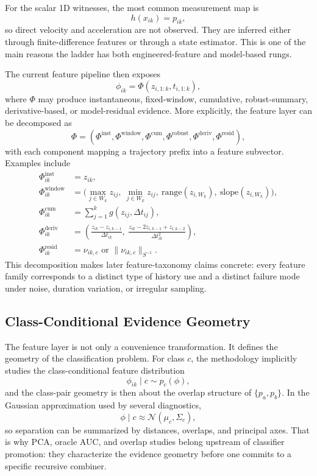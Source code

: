 \documentclass[11pt]{article}
\begin{document}
For the scalar 1D witnesses, the most common measurement map is
\begin{equation}
h(x_{ik}) = p_{ik},
\end{equation}
so direct velocity and acceleration are not observed. They are inferred either
through finite-difference features or through a state estimator. This is one of
the main reasons the ladder has both engineered-feature and model-based rungs.

The current feature pipeline then exposes
\begin{equation}
\phi_{ik} = \Phi(z_{i,1:k}, t_{i,1:k}),
\end{equation}
where \(\Phi\) may produce instantaneous, fixed-window, cumulative, robust-summary, derivative-based, or model-residual evidence.
More explicitly, the feature layer can be decomposed as
\begin{equation}
\Phi
=
(\Phi^{\mathrm{inst}},
\Phi^{\mathrm{window}},
\Phi^{\mathrm{cum}},
\Phi^{\mathrm{robust}},
\Phi^{\mathrm{deriv}},
\Phi^{\mathrm{resid}}),
\end{equation}
with each component mapping a trajectory prefix into a feature subvector.
Examples include
\begin{align}
\Phi^{\mathrm{inst}}_{ik} &= z_{ik}, \\
\Phi^{\mathrm{window}}_{ik} &= \bigl(\max_{j \in W_k} z_{ij},\ \min_{j \in W_k} z_{ij},\ \mathrm{range}(z_{i,W_k}),\ \mathrm{slope}(z_{i,W_k})\bigr), \\
\Phi^{\mathrm{cum}}_{ik} &= \sum_{j=1}^k g(z_{ij}, \Delta t_{ij}), \\
\Phi^{\mathrm{deriv}}_{ik} &= \left(\frac{z_{ik}-z_{i,k-1}}{\Delta t_{ik}},\ \frac{z_{ik}-2z_{i,k-1}+z_{i,k-2}}{\Delta t_{ik}^2}\right), \\
\Phi^{\mathrm{resid}}_{ik} &= \nu_{ik,c} \text{ or } \|\nu_{ik,c}\|_{S^{-1}}.
\end{align}
This decomposition makes later feature-taxonomy claims concrete: every feature
family corresponds to a distinct type of history use and a distinct failure
mode under noise, duration variation, or irregular sampling.

\subsection*{Class-Conditional Evidence Geometry}
The feature layer is not only a convenience transformation. It defines the
geometry of the classification problem. For class \(c\), the methodology
implicitly studies the class-conditional feature distribution
\begin{equation}
\phi_{ik} \mid c \sim p_c(\phi),
\end{equation}
and the class-pair geometry is then about the overlap structure of
\(\{p_a, p_b\}\). In the Gaussian approximation used by several diagnostics,
\begin{equation}
\phi \mid c \approx \mathcal{N}(\mu_c, \Sigma_c),
\end{equation}
so separation can be summarized by distances, overlaps, and principal axes.
That is why PCA, oracle AUC, and overlap studies belong upstream of classifier
promotion: they characterize the evidence geometry before one commits to a
specific recursive combiner.
\end{document}

